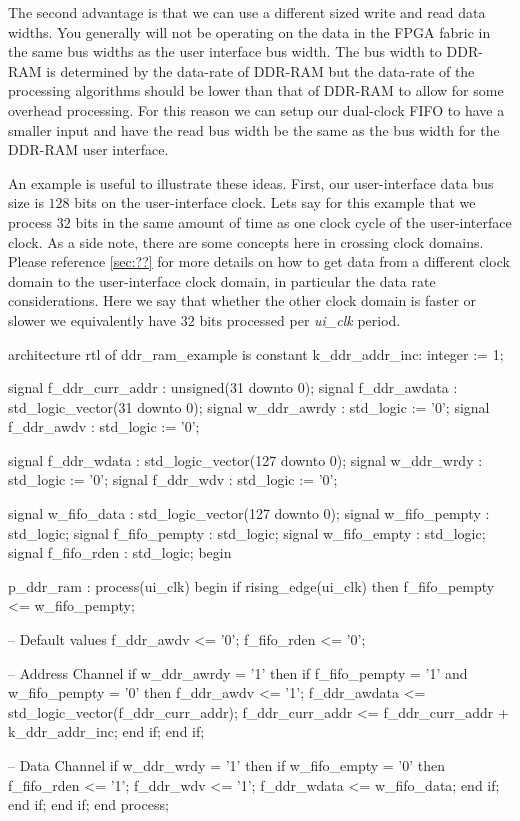 The second advantage is that we can use a different sized write and read data widths. You generally will not be operating on the data in the \ac{FPGA} fabric in the same bus widths as the user interface bus width. The bus width to \ac{DDR}-\ac{RAM} is determined by the data-rate of \ac{DDR}-\ac{RAM} but the data-rate of the processing algorithms should be lower than that of \ac{DDR}-\ac{RAM} to allow for some overhead processing. For this reason we can setup our dual-clock \ac{FIFO} to have a smaller input and have the read bus width be the same as the bus width for the \ac{DDR}-\ac{RAM} user interface. 

An example is useful to illustrate these ideas. First, our user-interface data bus size is $128$ bits on the user-interface clock. Lets say for this example that we process $32$ bits in the same amount of time as one clock cycle of the user-interface clock. As a side note, there are some concepts here in crossing clock domains. Please reference \ref{sec:??} for more details on how to get data from a different clock domain to the user-interface clock domain, in particular the data rate considerations. Here we say that whether the other clock domain is faster or slower we equivalently have $32$ bits processed per \emph{ui\_clk} period.  

\begin{VHDLlisting}[tabsize=4]
architecture rtl of ddr_ram_example is
	constant k_ddr_addr_inc: integer := 1;
	
	signal f_ddr_curr_addr : unsigned(31 downto 0);
	signal f_ddr_awdata    : std_logic_vector(31 downto 0);
	signal w_ddr_awrdy     : std_logic := '0';
	signal f_ddr_awdv      : std_logic := '0';

	signal f_ddr_wdata     : std_logic_vector(127 downto 0);
	signal w_ddr_wrdy      : std_logic := '0';
	signal f_ddr_wdv       : std_logic := '0';

	signal w_fifo_data     : std_logic_vector(127 downto 0); 
	signal w_fifo_pempty   : std_logic;
	signal f_fifo_pempty   : std_logic;
	signal w_fifo_empty    : std_logic;
	signal f_fifo_rden     : std_logic;	
begin

p_ddr_ram : process(ui_clk)
begin
	if rising_edge(ui_clk) then
		f_fifo_pempty <= w_fifo_pempty;
		
		-- Default values
		f_ddr_awdv <= '0';
		f_fifo_rden <= '0';
		
		-- Address Channel
		if w_ddr_awrdy = '1' then
			if f_fifo_pempty = '1' and w_fifo_pempty = '0' then
				f_ddr_awdv <= '1';
				f_ddr_awdata <= std_logic_vector(f_ddr_curr_addr);
				f_ddr_curr_addr <= f_ddr_curr_addr + k_ddr_addr_inc;
			end if;		
		end if;
		
		-- Data Channel
		if w_ddr_wrdy = '1' then
			if w_fifo_empty = '0' then
				f_fifo_rden <= '1';
				f_ddr_wdv <= '1';
				f_ddr_wdata <= w_fifo_data;
			end if;			
		end if;
	end if;
end process;
\end{VHDLlisting}

